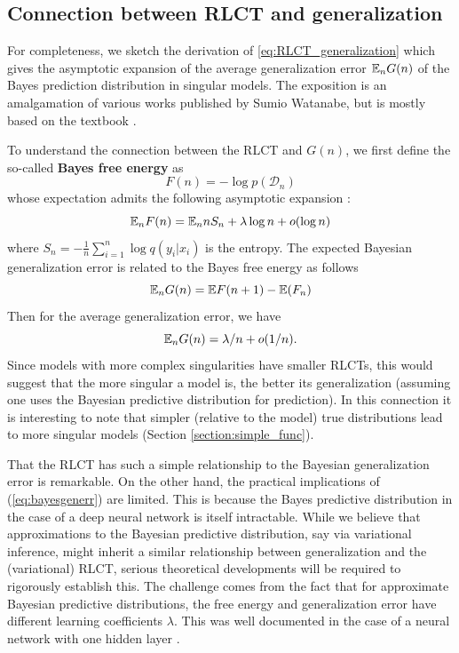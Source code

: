 \documentclass{article} %
\begin{document}
\subsection{Connection between RLCT and generalization} \label{appendix:generalization_theory}
For completeness, we sketch the derivation of \eqref{eq:RLCT_generalization} which gives the asymptotic expansion of the average generalization error ${\mathbb{E}}_n G(n)$ of the Bayes prediction distribution  in singular models. The exposition is an amalgamation of various works published by Sumio Watanabe, but is mostly based on the textbook \cite{watanabe_algebraic_2009}. 

To understand the connection between the RLCT and $G(n)$, we first define the so-called \textbf{Bayes free energy} as 
\[
F(n) = -\log p(\mathcal D_n)
\]
whose expectation admits the following asymptotic expansion \cite{watanabe_algebraic_2009}:
\[
{\mathbb{E}}_n F(n) =  {\mathbb{E}}_n n S_n + \lambda \log n + o(\log n)
\]
where $S_n = -\frac{1}{n} \sum_{i=1}^n \log q(y_i|x_i)$ is the entropy. 
The expected Bayesian generalization error is related to the Bayes free energy as follows
\[
{\mathbb{E}}_n G(n) = \mathbb{E} F(n+1) - \mathbb{E}(F_n)
\]
Then for the average generalization error, we have
\begin{equation}
{\mathbb{E}}_n G(n) = \lambda/n + o(1/n).
\label{eq:bayesgenerr}
\end{equation}
Since models with more complex singularities have smaller RLCTs, this would suggest that the more singular a model is, the better its generalization (assuming one uses the Bayesian predictive distribution for prediction). In this connection it is interesting to note that simpler (relative to the model) true distributions lead to more singular models (Section \ref{section:simple_func}).

That the RLCT has such a simple relationship to the Bayesian generalization error is remarkable. On the other hand, the practical implications of (\ref{eq:bayesgenerr}) are limited. This is because the Bayes predictive distribution in the case of a deep neural network is itself intractable. While we believe that approximations to the Bayesian predictive distribution, say via variational inference, might inherit a similar relationship between generalization and the (variational) RLCT, serious theoretical developments will be required to rigorously establish this. The challenge comes from the fact that for approximate Bayesian predictive distributions, the free energy and generalization error have different learning coefficients $\lambda$. This was well documented in the case of a neural network with one hidden layer \citep{nakajima_variational_2007}. 
\end{document}
